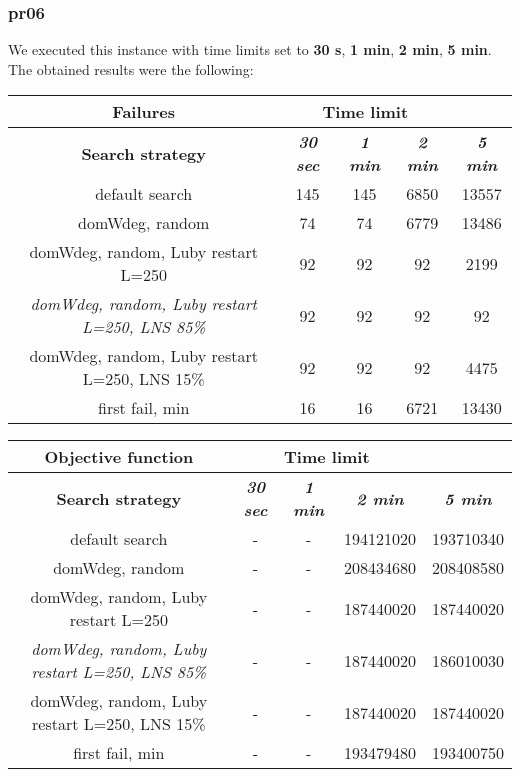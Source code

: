 \subsubsection{pr06}
We executed this instance with time limits set to \textbf{30 s}, \textbf{1 min}, \textbf{2 min}, \textbf{5 min}.\\
The obtained results were the following:
{
\renewcommand{\arraystretch}{2}
\begin{longtable}[h]{| c | c | c | c | c |}
    \hline
    \textbf{Failures} & \multicolumn{3}{c}{Time limit} & \\
    \hline
    \textbf{Search strategy} & \textbf{\textit{30 sec}} & \textbf{\textit{1 min}} & \textbf{\textit{2 min}} & \textbf{\textit{5 min}} \\
    \hline
    \endhead
    default search                                         & 145 &  145 &  6850 &  13557 \\
    \hline
    domWdeg, random                                        &  74 &   74 &  6779 &  13486 \\
    \hline
    domWdeg, random, Luby restart L=250                    &  92 &   92 &   92 &    2199 \\
    \hline
    \textit{domWdeg, random, Luby restart L=250, LNS 85\%} &  92 &   92 &   92 &      92 \\
    \hline
    domWdeg, random, Luby restart L=250, LNS 15\%          &  92 &   92 &   92 &    4475 \\
    \hline
    first fail, min                                        &  16 &   16 & 6721 &   13430 \\
    \hline
\end{longtable}
}

{
\renewcommand{\arraystretch}{2}
\begin{longtable}[h]{| c | c | c | c | c |}
    \hline
    \textbf{Objective function} & \multicolumn{3}{c}{Time limit} & \\
    \hline
    \textbf{Search strategy} & \textbf{\textit{30 sec}} & \textbf{\textit{1 min}} & \textbf{\textit{2 min}} & \textbf{\textit{5 min}} \\
    \hline
    \endhead
    default search                                         & - & - & 194121020 & 193710340 \\
    \hline
    domWdeg, random                                        & - & - & 208434680 & 208408580 \\
    \hline
    domWdeg, random, Luby restart L=250                    & - & - & 187440020 & 187440020 \\
    \hline
    \textit{domWdeg, random, Luby restart L=250, LNS 85\%} & - & - & 187440020 & 186010030 \\
    \hline
    domWdeg, random, Luby restart L=250, LNS 15\%          & - & - & 187440020 & 187440020 \\
    \hline
    first fail, min                                        & - & - & 193479480 & 193400750 \\
    \hline
\end{longtable}
}